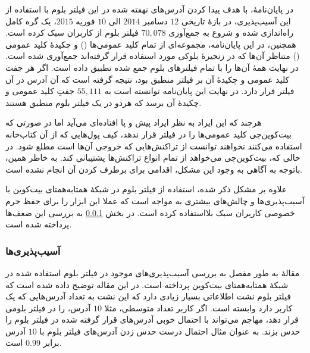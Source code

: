 

در پایان‌نامهٔ\cite{Nick2015}، با هدف پیدا کردن آدرس‌های نهفته شده در این فیلتر بلوم با استفاده از این آسیب‌پذیری، در بازهٔ تاریخی $12$ دسامبر $2014$ الی $10$ فوریه $2015$، یک گره کامل راه‌اندازی شده و شروع به جمع‌آوری $70,078$ فیلتر بلوم از کاربران سبک کرده است. همچنین، در این پایان‌نامه، مجموعه‌ای از تمام کلید عمومی‌ها () و چکیدهٔ کلید عمومی () متناظر آن‌ها که در زنجیرهٔ بلوکی مورد استفاده قرار گرفته‌اند جمع‌آوری شده است. در نهایت همهٔ آن‌ها را با تمام فیلتر‌های بلوم جمع شده تطبیق داده است. اگر هر جفت کلید عمومی و چکیدهٔ آن بر فیلتر منطبق بود، نتیجه گرفته است که آن آدرس در آن فیلتر قرار دارد. در نهایت این پایان‌نامه توانسته است به $55,111$ جفتِ کلید عمومی و چکیدهٔ آن برسد که هردو در یک فیلتر بلوم منطبق هستند.

هرچند که این ایراد به نظر ایراد پیش و پا افتاده‌ای می‌آید اما در صورتی که بیت‌کوین‌جی کلید عمومی‌ها را در فیلتر قرار ندهد، کیف پول‌هایی که از آن کتاب‌خانه استفاده می‌کنند نخواهند توانست از تراکنش‌هایی که خروجی آن‌ها  است مطلع شود. در حالی که، بیت‌کوین‌جی می‌خواهد از تمام انواع تراکنش‌ها پشتیبانی کند. به خاطر همین، باتوجه به آگاهی به وجود این مشکل، اقدامی برای برطرف کردن آن انجام نشده است.

علاوه بر مشکل ذکر شده، استفاده از فیلتر بلوم در شبکهٔ همتا‌به‌همتای بیت‌کوین با آسیب‌پذیری‌ها و چالش‌های بیشتری به مواجه است که عملا این ابزار را برای حفظ حرم خصوصی کاربران سبک بلااستفاده کرده است. در بخش \ref{Vulnerabilities} به بررسی این ضعف‌ها پرداخته شده است.

\subsubsection{آسیب‌‌پذیری‌ها }
\label{Vulnerabilities}
مقالهٔ \cite{Gervais2014} به طور مفصل به بررسی آسیب‌پذیری‌های موجود در فیلتر بلوم استفاده شده در شبکهٔ همتا‌به‌همتای بیت‌کوین پرداخته است. در این مقاله توضیح داده شده است که فیلتر بلوم نشت اطلاعاتی بسیار زیادی دارد که این نشت به تعداد آدرس‌هایی که یک کاربر دارد وابسته است. اگر کاربر تعداد متوسطی، مثلا $10$ آدرس، را در فیلتر بلومی قرار دهد، مهاجم می‌تواند با احتمال خوبی آدرس‌های قرار گرفته شده در فیلتر بلوم را حدس بزند. به عنوان مثال احتمال درست حدس زدن آدرس‌های فیلتر بلوم با $10$ آدرس برابر $0.99$ است.  

